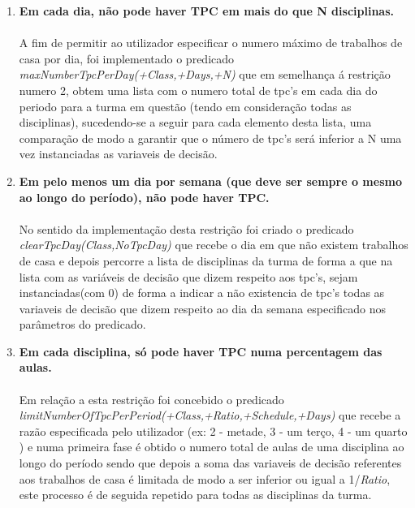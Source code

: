 \documentclass{llncs}
\begin{document}
\begin{enumerate}
	\item \textbf{Em cada dia, não pode haver TPC em mais do que N disciplinas.} \\\\
		A fim de permitir ao utilizador especificar o numero máximo de trabalhos de casa por dia, foi implementado o predicado \textit{maxNumberTpcPerDay(+Class,+Days,+N)} que em semelhança á restrição numero 2,
		obtem uma lista com o numero total de tpc's em cada dia do periodo para a turma em questão (tendo em consideração todas as disciplinas), sucedendo-se a seguir para cada elemento desta lista, uma comparação 
		de modo a garantir que o número de tpc's será inferior a N uma vez instanciadas as variaveis de decisão.
		\\

	\item \textbf{Em pelo menos um dia por semana (que deve ser sempre o mesmo ao longo do período), não pode haver TPC.} \\\\
		No sentido da implementação desta restrição foi criado o predicado \textit{clearTpcDay(Class,NoTpcDay)} que recebe o dia em que não existem trabalhos de casa e depois percorre a lista de disciplinas da turma 
		de forma a que na lista com as variáveis de decisão que dizem respeito aos tpc's, sejam instanciadas(com 0) de forma a indicar a não existencia de tpc's todas as variaveis de decisão que dizem respeito ao dia da 
		semana especificado nos parâmetros do predicado.
		\\

	\item \textbf{Em cada disciplina, só pode haver TPC numa percentagem das aulas.} \\\\
		Em relação a esta restrição foi concebido o predicado  \textit{limitNumberOfTpcPerPeriod(+Class,+Ratio,+Schedule,+Days)} que recebe a razão especificada pelo utilizador (ex: 2 - metade, 3 - um terço, 4 - um 
		quarto ) e numa primeira fase é obtido o numero total de aulas de uma disciplina ao longo do período sendo que depois a soma das variaveis de decisão referentes aos trabalhos de casa é limitada de modo a ser 
		inferior ou igual a  1/\textit{Ratio}, este processo é de seguida repetido para todas as disciplinas da turma. 
	 	\\

	\end{enumerate}
		
	
	
 
 
\end{document}
